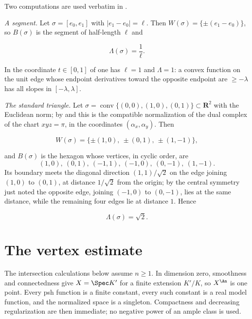 \begin{example}
\label{ex:ch22-gauge-computed}
Two computations are used verbatim in
.

\emph{A segment.}  Let $\sigma=[e_0,e_1]$ with
$|e_1-e_0|=\ell$.  Then $W(\sigma)=\{\pm(e_1-e_0)\}$, so
$B(\sigma)$ is the segment of half-length $\ell$ and

\[
 \Lambda(\sigma)=\frac1\ell .
\tag{22.18}\label{eq:ch22-gauge-segment}
\]

In the coordinate $t\in[0,1]$ of  one has
$\ell=1$ and $\Lambda=1$: a convex function on the unit edge whose
endpoint derivatives toward the opposite endpoint are $\geq-\lambda$ has
all slopes in $[-\lambda,\lambda]$.

\emph{The standard triangle.}  Let
$\sigma=\operatorname{conv}\{(0,0),(1,0),(0,1)\}\subset\mathbf R^2$ with
the Euclidean norm; by  and
 this is the compatible normalization of the
dual complex of the chart $xyz=\pi$, in the coordinates
$(\alpha_x,\alpha_y)$.  Then

\[
 W(\sigma)=\{\pm(1,0),\ \pm(0,1),\ \pm(1,-1)\},
\]

and $B(\sigma)$ is the hexagon whose vertices, in cyclic order, are
\[
 (1,0),\ (0,1),\ (-1,1),\ (-1,0),\ (0,-1),\ (1,-1).
\]
Its boundary meets the
diagonal direction $(1,1)/\sqrt2$ on the edge joining $(1,0)$ to
$(0,1)$, at distance $1/\sqrt2$ from the origin; by the central symmetry
just noted the opposite edge, joining $(-1,0)$ to $(0,-1)$, lies at the
same distance, while the remaining four edges lie at distance $1$.  Hence

\[
 \Lambda(\sigma)=\sqrt2 .
\tag{22.19}\label{eq:ch22-gauge-triangle}
\]
\end{example}

\section{The vertex estimate}
\label{sec:ch22-vertex}

The intersection calculations below assume $n\geq1$.  In dimension zero,
smoothness and connectedness give $X=\Spec K'$ for a finite extension
$K'/K$, so $X^{\An}$ is one point.  Every psh function is a finite
constant, every such constant is a real model function, and the normalized
space is a singleton.  Compactness and decreasing regularization are then
immediate; no negative power of an ample class is used.

